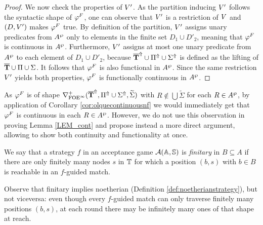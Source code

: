 \begin{proof}
We now check the properties of $V'$. As the partition inducing $V'$ follows the syntactic shape of $\varphi^{F}$, one can observe that $V'$ is a restriction of $V$ and $(D,V')$ makes $\varphi^{F}$ true. By definition of the partition, $V'$ assigns unary predicates from $A^{\wp}$ only to elements in the finite set $D_1 \cup D'_2$, meaning that $\varphi^{F}$ is continuous in $A^{\wp}$. Furthermore, $V'$ assigns at most one unary predicate from $A^{\wp}$ to each element of $D_1 \cup D'_2$, because $\overline{{\mathbf{T}}}^{\Uparrow} \cup \Pi^{\Uparrow} \cup \Sigma^{\Uparrow}$ is defined as the lifting of $\overline{{\mathbf{T}}} \cup \Pi \cup \Sigma$. It follows that $\varphi^{F}$ is also functional in $A^{\wp}$. Since the same restriction $V'$ yields both properties, $\varphi^{F}$ is functionally continuous in $A^{\wp}$.
\end{proof}

\begin{remark} As $\varphi^{F}$ is of shape $\nabla^+_{\mathrm{FOE}^{\infty}}(\overline{{\mathbf{T}}}^{\Uparrow},\Pi^{\Uparrow} \cup \Sigma^{\Uparrow},\widetilde{\Sigma})$ with $R \not\in \bigcup\widetilde{\Sigma}$ for each $R \in A^{\wp}$, by application of Corollary \ref{cor:olquecontinuousnf} we would immediately get that $\varphi^{F}$ is continuous in each $R \in A^{\wp}$. However, we do not use this observation in proving Lemma \ref{LEM_cont} and propose instead a more direct argument, allowing to show both continuity and functionality at once.
\end{remark}


\begin{definition}\label{def:finitarystrategy}
We say that a strategy $f$ in an acceptance game $\mathcal{A}(\mathbb{A},\mathbb{S})$ is \emph{finitary} in $B \subseteq A$ if there are only finitely many nodes $s$ in $\mathbb{T}$ for which a position $(b,s)$ with $b \in B$ is reachable in an $f$-guided match. \end{definition}
Observe that finitary implies noetherian (Definition \ref{def:noetherianstrategy}), but not viceversa: even though every $f$-guided match can only traverse finitely many positions $(b,s)$, at each round there may be infinitely many ones of that shape at reach.


